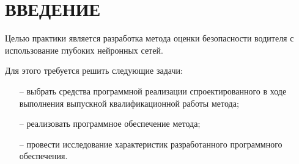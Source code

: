 \section*{ВВЕДЕНИЕ}

Целью практики является разработка метода оценки безопасности водителя с использование глубоких нейронных сетей.

Для этого требуется решить следующие задачи:
\begin{itemize}[leftmargin=1.6\parindent]
	\item[--] выбрать средства программной реализации спроектированного в ходе выполнения
	выпускной квалификационной работы метода;
	\item[--] реализовать программное обеспечение метода;
	\item[--] провести исследование характеристик разработанного программного обеспечения.
\end{itemize}

\pagebreak